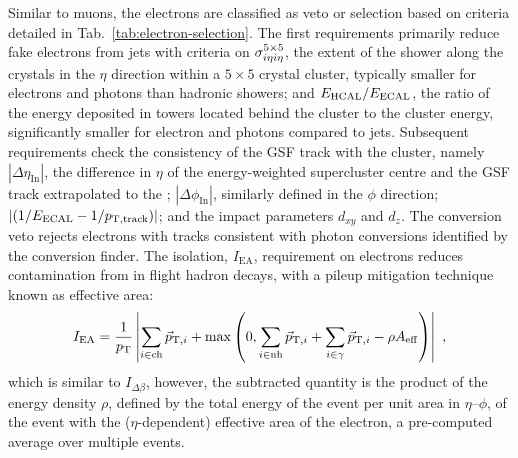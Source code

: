 Similar to muons, the electrons are classified as veto or selection based on criteria detailed in Tab.~\ref{tab:electron-selection}. The first requirements primarily reduce fake electrons from jets with criteria on $\sigma_{i\eta i\eta}^{5\times 5}$, the extent of the shower along the \ECAL crystals in the $\eta$ direction within a $5\times 5$ crystal cluster, typically smaller for electrons and photons than hadronic showers; and $E_{\mathrm{HCAL}}/E_{\mathrm{ECAL}}$, the ratio of the energy deposited in \HCAL towers located behind the \ECAL cluster to the \ECAL cluster energy, significantly smaller for electron and photons compared to jets. Subsequent requirements check the consistency of the GSF track with the \ECAL cluster, namely $|\Delta\eta_{\mathrm{In}}|$, the difference in $\eta$ of the energy-weighted supercluster centre and the GSF track extrapolated to the \ECAL; $|\Delta\phi_{\mathrm{In}}|$, similarly defined in the $\phi$ direction; $|(1/E_{\mathrm{ECAL}} - 1/p_{\mathrm{T,track}})|$; and the impact parameters $d_{xy}$ and $d_{z}$. The conversion veto rejects electrons with tracks consistent with photon conversions identified by the conversion finder. The isolation, $I_{\mathrm{EA}}$, requirement on electrons reduces contamination from in flight hadron decays, with a pileup mitigation technique known as effective area:
%
\begin{equation}
    I_{\mathrm{EA}} = \frac{1}{p_{\text{T}}} \left| \sum_{i\in\mathrm{ch}} \vec{p}_{\mathrm{T},i} + \max\left(0, \sum_{i\in\mathrm{nh}}\vec{p}_{\mathrm{T},i} + \sum_{i\in\gamma}\vec{p}_{\mathrm{T},i} - \rho A_{\mathrm{eff}}\right) \right|\ ,
\end{equation}
%
which is similar to $I_{\Delta\beta}$, however, the subtracted quantity is the product of the energy density $\rho$, defined by the total energy of the event per unit area in $\eta$--$\phi$, of the event with the ($\eta$-dependent) effective area of the electron, a pre-computed average over multiple events.

